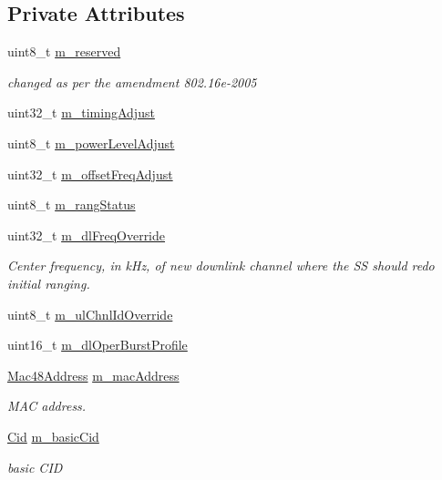 \subsection*{Private Attributes}
\begin{DoxyCompactItemize}
\item 
uint8\+\_\+t \hyperlink{classns3_1_1RngRsp_ac2b0e49e6b52d0e0050d2e35ad97e58b}{m\+\_\+reserved}
\begin{DoxyCompactList}\small\item\em changed as per the amendment 802.\+16e-\/2005 \end{DoxyCompactList}\item 
uint32\+\_\+t \hyperlink{classns3_1_1RngRsp_ad5a122d3cc7cf596f00d0abc711d9062}{m\+\_\+timing\+Adjust}
\item 
uint8\+\_\+t \hyperlink{classns3_1_1RngRsp_a901da94288993e4e4f0cd897e65fb91a}{m\+\_\+power\+Level\+Adjust}
\item 
uint32\+\_\+t \hyperlink{classns3_1_1RngRsp_ac84bb59d1be77321bb81cf7bf29ca11d}{m\+\_\+offset\+Freq\+Adjust}
\item 
uint8\+\_\+t \hyperlink{classns3_1_1RngRsp_a47662e9c2019c4b84d6fe0f15405136e}{m\+\_\+rang\+Status}
\item 
uint32\+\_\+t \hyperlink{classns3_1_1RngRsp_a542bcf2ebe6f5241700fcbeeb3b63fe3}{m\+\_\+dl\+Freq\+Override}
\begin{DoxyCompactList}\small\item\em Center frequency, in k\+Hz, of new downlink channel where the SS should redo initial ranging. \end{DoxyCompactList}\item 
uint8\+\_\+t \hyperlink{classns3_1_1RngRsp_a8f7fff24a6ac3f55bc935b7cc7234090}{m\+\_\+ul\+Chnl\+Id\+Override}
\item 
uint16\+\_\+t \hyperlink{classns3_1_1RngRsp_a0e814c8df274e0681dbb33f7b3bb2e1a}{m\+\_\+dl\+Oper\+Burst\+Profile}
\item 
\hyperlink{classns3_1_1Mac48Address}{Mac48\+Address} \hyperlink{classns3_1_1RngRsp_a0928510e078fa288dd8b0c6a8e728e74}{m\+\_\+mac\+Address}
\begin{DoxyCompactList}\small\item\em M\+AC address. \end{DoxyCompactList}\item 
\hyperlink{classns3_1_1Cid}{Cid} \hyperlink{classns3_1_1RngRsp_acc67a4d993abc670d76279b031ff6103}{m\+\_\+basic\+Cid}
\begin{DoxyCompactList}\small\item\em basic C\+ID \end{DoxyCompactList}\item 

\end{DoxyCompactItemize}
